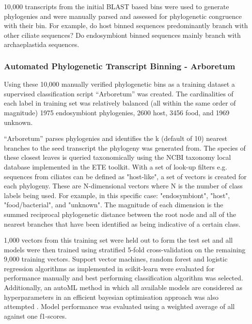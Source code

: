 10,000 transcripts from the initial BLAST based bins were used to generate phylogenies 
and were manually parsed and assessed for phylogenetic congruence with their bin.
For example, do host binned sequences predominantly branch with other ciliate sequences?
Do endosymbiont binned sequences mainly branch with archaeplastida sequences. 

\subsubsection{Automated Phylogenetic Transcript Binning - Arboretum}

Using these 10,000 manually verified phylogenetic bins as a training dataset a supervised classification
script ``Arboretum'' was created.  The cardinalities of each label in training set was relatively balanced (all within
the same order of magnitude) 1975 endosymbiont phylogenies, 2600 host, 3456 food, and 1969
unknown. 

``Arboretum'' parses phylogenies and identifies the k (default of 10) nearest branches to the seed transcript
the phylogeny was generated from.  The species of these closest leaves is queried taxonomically using the
NCBI taxonomy local database implemented in the ETE toolkit.  With a set of look-up filters e.g.
sequences from ciliates can be defined as "host-like", a set of vectors is created for each phylogeny.  
These are N-dimensional vectors where N is the number of class labels being used. 
For example, in this specific case: "endosymbiont", "host", "food/bacterial", and "unknown".
The magnitude of each dimension is the summed reciprocal phylogenetic distance between the root node and all
of the nearest branches that have been identified as being indicative of a certain class.

1,000 vectors from this training set were held out to form the test set and all models were then trained
using stratified 5-fold cross-validation on the remaining 9,000 training vectors. 
Support vector machines, random forest and logistic regression algorithms as implemented in scikit-learn 
were evaluated for performance manually and best performing classification algorithm was selected.
Additionally, an autoML method in which all available models are considered as hyperparameters in an efficient
bayesian optimisation approach was also attempted \citep{Komer2014}. 
Model performance was evaluated using a weighted average of all against one f1-scores.






